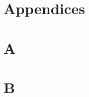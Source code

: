 \documentclass[11pt]{article}
\theoremstyle{definition}
\begin{document}
\pagebreak
\tableofcontents
\pagebreak

\pagebreak
\appendix
\clearpage
\appendix

\section*{Appendices}
\renewcommand{\thesection}{\Alph{section}}
\renewcommand{\thesubsection}{\thesection.\arabic{subsection}}
\renewcommand{\thesubsubsection}{\thesubsection.\arabic{subsubsection}}
\setcounter{section}{0}
\setcounter{subsection}{0}
\section{A}

\pagebreak

\pagebreak

\pagebreak

\pagebreak

\pagebreak

\pagebreak
\section{B}

\pagebreak

\pagebreak

\pagebreak

\pagebreak

\pagebreak

\end{document}
